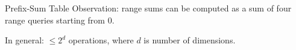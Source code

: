 \documentclass{beamer}
\theoremstyle{definition}
\theoremstyle{definition}
\begin{document}
\begin{frame}{Prefix-Sum Table}
    Observation: range sums can be computed as a sum of four range queries starting from 0.\cite{Ho97}

\begin{figure}
    \centering
    \pause
    \subfigure{=}
    \pause
    \pause
    \subfigure{-}
    \pause
    \subfigure{-}
    \pause
    \subfigure{+}
\end{figure}
\pause
In general: $\leq 2^d$ operations, where $d$ is number of dimensions.
\end{frame}
\end{document}
